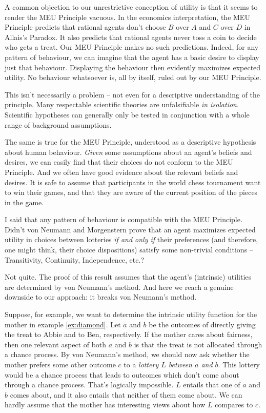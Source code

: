 A common objection to our unrestrictive conception of utility is that it seems
to render the MEU Principle vacuous. In the economics interpretation, the MEU
Principle predicts that rational agents don't choose $B$ over $A$ and $C$ over
$D$ in Allais's Paradox. It also predicts that rational agents never toss a coin
to decide who gets a treat. Our MEU Principle makes no such predictions. Indeed,
for any pattern of behaviour, we can imagine that the agent has a basic desire
to display just that behaviour. Displaying the behaviour then evidently
maximizes expected utility. No behaviour whatsoever is, all by itself, ruled out
by our MEU Principle.

This isn't necessarily a problem -- not even for a descriptive understanding of
the principle. Many respectable scientific theories are unfalsifiable \emph{in
  isolation}. Scientific hypotheses can generally only be tested in conjunction
with a whole range of background assumptions.

The same is true for the MEU Principle, understood as a descriptive hypothesis
about human behaviour. \emph{Given} some assumptions about an agent's beliefs
and desires, we can easily find that their choices do not conform to the MEU
Principle. And we often have good evidence about the relevant beliefs and
desires. It is safe to assume that participants in the world chess
tournament want to win their games, and that they are aware of the current
position of the pieces in the game.

I said that any pattern of behaviour is compatible with the MEU Principle.
Didn't von Neumann and Morgenstern prove that an agent maximizes expected
utility in choices between lotteries \emph{if and only if} their preferences
(and therefore, one might think, their choice dispositions) satisfy some
non-trivial conditions -- Transitivity, Continuity, Independence, etc.?

Not quite. The proof of this result assumes that the agent's (intrinsic)
utilities are determined by von Neumann's method. And here we reach a genuine
downside to our approach: it breaks von Neumann's method.

Suppose, for example, we want to determine the intrinsic utility function for
the mother in example \ref{ex:diamond}. Let $a$ and $b$ be the outcomes of
directly giving the treat to Abbie and to Ben, respectively. If the mother cares
about fairness, then one relevant aspect of both $a$ and $b$ is that the treat
is not allocated through a chance process. By von Neumann's method, we should
now ask whether the mother prefers some other outcome $c$ to a \emph{lottery $L$
  between $a$ and $b$}. This lottery would be a chance process that leads to
outcomes which don't come about through a chance process. That's logically
impossible. $L$ entails that one of $a$ and $b$ comes about, and it also entails
that neither of them come about. We can hardly assume that the mother has
interesting views about how $L$ compares to $c$.

